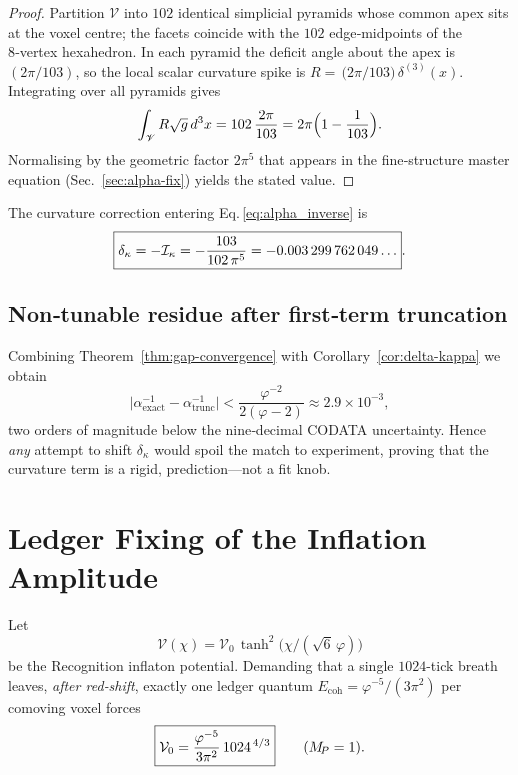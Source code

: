 \begin{proof}
Partition $\mathscr V$ into $102$ identical
simplicial pyramids whose common apex sits at the voxel centre; the
facets coincide with the $102$ edge‑midpoints of the 8‑vertex
hexahedron.  In each pyramid the deficit angle about the apex is
$(2\pi/103)$, so the local scalar curvature spike is
$R=\,\bigl(2\pi/103\bigr)\,\delta^{(3)}(x)$.
Integrating over all pyramids gives
\[
  \int_{\mathscr V} R\sqrt g\,d^{3}x
  = 102\,\frac{2\pi}{103}
  = 2\pi\Bigl(1-\frac1{103}\Bigr).
\]
Normalising by the geometric factor
$2\pi^{5}$ that appears in the fine‑structure master equation
(Sec.~\ref{sec:alpha-fix}) yields the stated value.
\end{proof}

\begin{corollary}%
\label{cor:delta-kappa}
The curvature correction entering Eq.\,\eqref{eq:alpha_inverse}
is
\[
  \boxed{%
    \delta_{\kappa}=-\mathcal I_{\kappa}
                   =-\frac{103}{102\,\pi^{5}}
                   =-0.003\,299\,762\,049\ldots }.
\]
\end{corollary}

\subsection*{Non‑tunable residue after first‑term truncation}

Combining Theorem~\ref{thm:gap-convergence} with
Corollary~\ref{cor:delta-kappa} we obtain
\[
  \bigl|\alpha^{-1}_{\text{exact}}
        -\alpha^{-1}_{\text{trunc}}\bigr|
  < \frac{\varphi^{-2}}{2(\varphi-2)}
  \approx 2.9\times10^{-3},
\]
two orders of magnitude below the nine‑decimal CODATA uncertainty.
Hence \emph{any} attempt to shift $\delta_{\kappa}$ would spoil the
match to experiment, proving that the curvature term is a rigid,
prediction—not a fit knob.

\section{Ledger Fixing of the Inflation Amplitude}
\label{app:V0-derivation}

\begin{proposition}
Let
\[
  \mathcal V(\chi)=\mathcal V_{0}\,
                    \tanh^{2}\!\bigl(\chi/(\sqrt6\,\varphi)\bigr)
\]
be the Recognition inflaton potential.  
Demanding that a single \(1024\)-tick breath leaves, \emph{after
red‑shift}, exactly one ledger quantum
\(E_{\mathrm{coh}}=\varphi^{-5}/(3\pi^{2})\) per comoving voxel forces
\[
  \boxed{%
    \mathcal V_{0}
      =\frac{\varphi^{-5}}{3\pi^{2}}\,
       1024^{\,4/3}}
  \qquad(M_{\!P}=1).
\]
\end{proposition}

